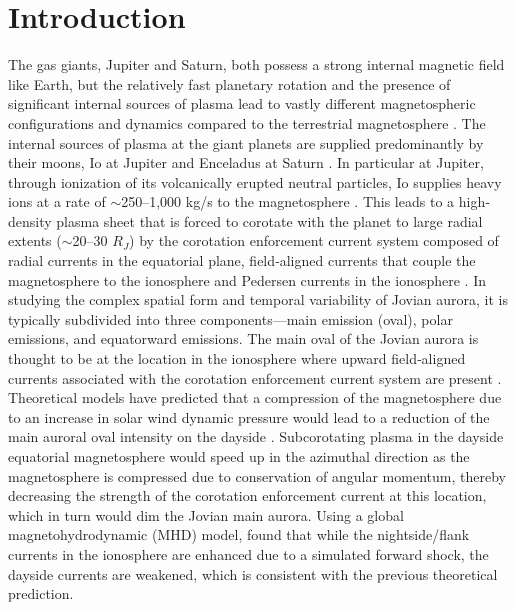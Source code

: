 \section{Introduction}
The gas giants, Jupiter and Saturn, both possess a strong internal magnetic field like Earth, but the relatively fast planetary rotation and the presence of significant internal sources of plasma lead to vastly different magnetospheric configurations and dynamics compared to the terrestrial magnetosphere \cite{Khurana2004a,Krupp2004DynamicsMagnetosphere}. The internal sources of plasma at the giant planets are supplied predominantly by their moons, Io at Jupiter \cite{Bolton2015a} and Enceladus at Saturn \cite{Blanc2015}. In particular at Jupiter, through ionization of its volcanically erupted neutral particles, Io supplies heavy ions at a rate of $\sim$250–1,000 kg/s to the magnetosphere \cite{Bagenal2011b}. This leads to a high‐density plasma sheet that is forced to corotate with the planet to large radial extents ($\sim$20–30 $R_J$) by the corotation enforcement current system composed of radial currents in the equatorial plane, field‐aligned currents that couple the magnetosphere to the ionosphere and Pedersen currents in the ionosphere \cite{Cowley2003a,Cowley2001a,Hill1979,Hill1980,Hill2001,Vasyliunas1983a}. In studying the complex spatial form and temporal variability of Jovian aurora, it is typically subdivided into three components—main emission (oval), polar emissions, and equatorward emissions. The main oval of the Jovian aurora is thought to be at the location in the ionosphere where upward field‐aligned currents associated with the corotation enforcement current system are present \cite{Cowley2001a,Hill2001,Southwood2001a}. Theoretical models have predicted that a compression of the magnetosphere due to an increase in solar wind dynamic pressure would lead to a reduction of the main auroral oval intensity on the dayside \cite{Cowley2003a,Cowley2007,Southwood2001a}. Subcorotating plasma in the dayside equatorial magnetosphere would speed up in the azimuthal direction as the magnetosphere is compressed due to conservation of angular momentum, thereby decreasing the strength of the corotation enforcement current at this location, which in turn would dim the Jovian main aurora. Using a global magnetohydrodynamic (MHD) model,  found that while the nightside/flank currents in the ionosphere are enhanced due to a simulated forward shock, the dayside currents are weakened, which is consistent with the previous theoretical prediction. 

